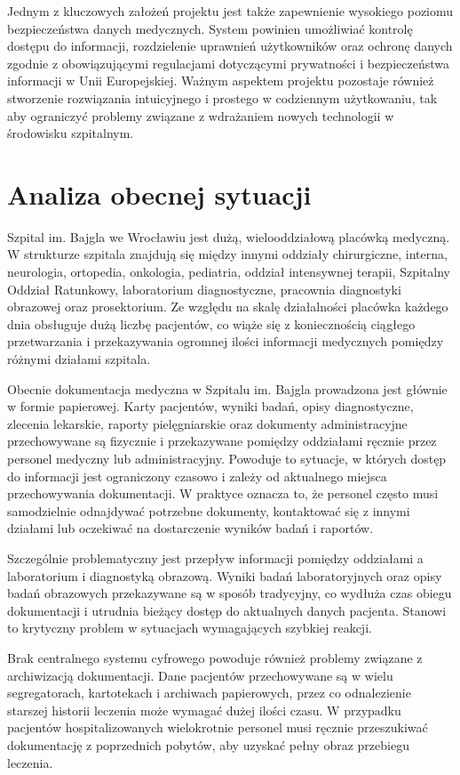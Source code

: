 Jednym z kluczowych założeń projektu jest także zapewnienie wysokiego poziomu bezpieczeństwa danych medycznych. System powinien umożliwiać kontrolę dostępu do informacji, rozdzielenie uprawnień użytkowników oraz ochronę danych zgodnie z obowiązującymi regulacjami dotyczącymi prywatności i bezpieczeństwa informacji w Unii Europejskiej. Ważnym aspektem projektu pozostaje również stworzenie rozwiązania intuicyjnego i prostego w codziennym użytkowaniu, tak aby ograniczyć problemy związane z wdrażaniem nowych technologii w środowisku szpitalnym.
\section{Analiza obecnej sytuacji}
Szpital im. Bajgla we Wrocławiu jest dużą, wielooddziałową placówką medyczną. W strukturze szpitala znajdują się między innymi oddziały chirurgiczne, interna, neurologia, ortopedia, onkologia, pediatria, oddział intensywnej terapii, Szpitalny Oddział Ratunkowy, laboratorium diagnostyczne, pracownia diagnostyki obrazowej oraz prosektorium. Ze względu na skalę działalności placówka każdego dnia obsługuje dużą liczbę pacjentów, co wiąże się z koniecznością ciągłego przetwarzania i przekazywania ogromnej ilości informacji medycznych pomiędzy różnymi działami szpitala.

Obecnie dokumentacja medyczna w Szpitalu im. Bajgla prowadzona jest głównie w formie papierowej. Karty pacjentów, wyniki badań, opisy diagnostyczne, zlecenia lekarskie, raporty pielęgniarskie oraz dokumenty administracyjne przechowywane są fizycznie i przekazywane pomiędzy oddziałami ręcznie przez personel medyczny lub administracyjny. Powoduje to sytuacje, w których dostęp do informacji jest ograniczony czasowo i zależy od aktualnego miejsca przechowywania dokumentacji. W praktyce oznacza to, że personel często musi samodzielnie odnajdywać potrzebne dokumenty, kontaktować się z innymi działami lub oczekiwać na dostarczenie wyników badań i raportów.

Szczególnie problematyczny jest przepływ informacji pomiędzy oddziałami a laboratorium i diagnostyką obrazową. Wyniki badań laboratoryjnych oraz opisy badań obrazowych przekazywane są w sposób tradycyjny, co wydłuża czas obiegu dokumentacji i utrudnia bieżący dostęp do aktualnych danych pacjenta. Stanowi to krytyczny problem w sytuacjach wymagających szybkiej reakcji.

Brak centralnego systemu cyfrowego powoduje również problemy związane z archiwizacją dokumentacji. Dane pacjentów przechowywane są w wielu segregatorach, kartotekach i archiwach papierowych, przez co odnalezienie starszej historii leczenia może wymagać dużej ilości czasu. W przypadku pacjentów hospitalizowanych wielokrotnie personel musi ręcznie przeszukiwać dokumentację z poprzednich pobytów, aby uzyskać pełny obraz przebiegu leczenia.


